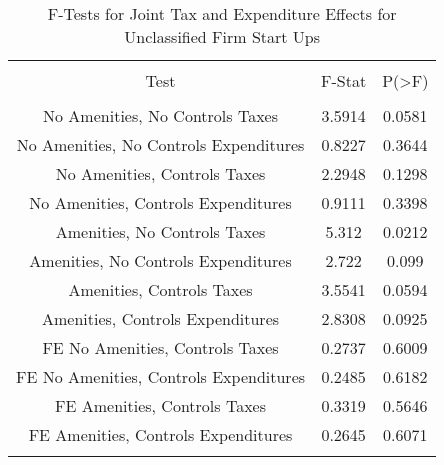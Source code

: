 
\begin{table}[!htbp] \centering 
  \caption{F-Tests for Joint Tax and Expenditure Effects for Unclassified Firm Start Ups} 
  \label{99Ftests} 
\begin{tabular}{@{\extracolsep{5pt}} ccc} 
\\[-1.8ex]\hline 
\hline \\[-1.8ex] 
Test & F-Stat & P(\textgreater F) \\ 
\hline \\[-1.8ex] 
No Amenities, No Controls Taxes & 3.5914 & 0.0581 \\ 
No Amenities, No Controls Expenditures & 0.8227 & 0.3644 \\ 
No Amenities, Controls Taxes & 2.2948 & 0.1298 \\ 
No Amenities, Controls Expenditures & 0.9111 & 0.3398 \\ 
Amenities, No Controls Taxes & 5.312 & 0.0212 \\ 
Amenities, No Controls Expenditures & 2.722 & 0.099 \\ 
Amenities, Controls Taxes & 3.5541 & 0.0594 \\ 
Amenities, Controls Expenditures & 2.8308 & 0.0925 \\ 
FE No Amenities, Controls Taxes & 0.2737 & 0.6009 \\ 
FE No Amenities, Controls Expenditures & 0.2485 & 0.6182 \\ 
FE Amenities, Controls Taxes & 0.3319 & 0.5646 \\ 
FE Amenities, Controls Expenditures & 0.2645 & 0.6071 \\ 
\hline \\[-1.8ex] 
\end{tabular} 
\end{table} 
